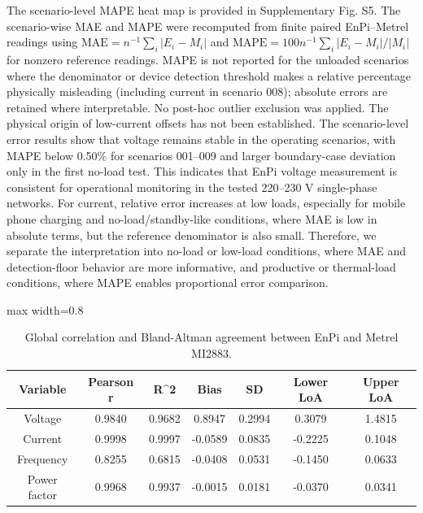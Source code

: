 \documentclass[technologies,article,submit,pdftex,moreauthors]{Definitions/mdpi}
\begin{document}
The scenario-level MAPE heat map is provided in Supplementary Fig. S5. The scenario-wise MAE and MAPE were recomputed from finite paired EnPi--Metrel readings using $\mathrm{MAE}=n^{-1}\sum_i|E_i-M_i|$ and $\mathrm{MAPE}=100n^{-1}\sum_i|E_i-M_i|/|M_i|$ for nonzero reference readings. MAPE is not reported for the unloaded scenarios where the denominator or device detection threshold makes a relative percentage physically misleading (including current in scenario 008); absolute errors are retained where interpretable. No post-hoc outlier exclusion was applied. The physical origin of low-current offsets has not been established.
The scenario-level error results show that voltage remains stable in the operating scenarios, with MAPE below 0.50\% for scenarios 001--009 and larger boundary-case deviation only in the first no-load test. This indicates that EnPi voltage measurement is consistent for operational monitoring in the tested 220--230 V single-phase networks. For current, relative error increases at low loads, especially for mobile phone charging and no-load/standby-like conditions, where MAE is low in absolute terms, but the reference denominator is also small. Therefore, we separate the interpretation into no-load or low-load conditions, where MAE and detection-floor behavior are more informative, and productive or thermal-load conditions, where MAPE enables proportional error comparison.

\begin{table}
\caption{Global correlation and Bland-Altman agreement between EnPi and Metrel MI2883.}
\label{tab:correlacion-global-y-acuerdo-de-bland-altman-}
\centering
\scriptsize
\begin{adjustbox}{max width=0.8\textwidth}
\begin{tabular}{ccccccc}
\toprule
Variable & Pearson r & R\textasciicircum{}2 & Bias & SD & Lower LoA & Upper LoA \\
\midrule
Voltage & 0.9840 & 0.9682 & 0.8947 & 0.2994 & 0.3079 & 1.4815 \\
Current & 0.9998 & 0.9997 & -0.0589 & 0.0835 & -0.2225 & 0.1048 \\
Frequency & 0.8255 & 0.6815 & -0.0408 & 0.0531 & -0.1450 & 0.0633 \\
Power factor & 0.9968 & 0.9937 & -0.0015 & 0.0181 & -0.0370 & 0.0341 \\
\bottomrule
\end{tabular}
\end{adjustbox}
\end{table}
\end{document}
